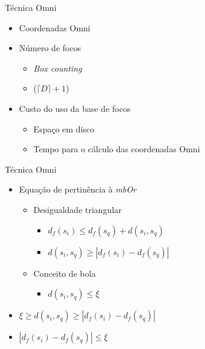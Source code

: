 \documentclass{beamer}
\begin{document}
\begin{frame}{Técnica Omni}
  
  \begin{itemize}
    
   \item Coordenadas Omni \newline
   
   \item Número de focos
      \begin{itemize}
	\item \textit{Box counting}\newline
	\item ($\lceil D \rceil +1$) \newline
      \end{itemize}
   
    \item Custo do uso da base de focos
      \begin{itemize}
	\item Espaço em disco\newline
	\item Tempo para o cálculo das coordenadas Omni\newline
      \end{itemize}	
  \end{itemize}

 
\end{frame}

\begin{frame}{Técnica Omni}

	\begin{itemize}
	 \item Equação de pertinência à \textit{mbOr}\newline
	    \begin{itemize}
	      \item Desigualdade triangular\newline
		\begin{itemize}
		  \item $d_{f}(s_i) \leq d_{f}(s_q) + d(s_i, s_q)$\newline
		  \item $d(s_i, s_q) \geq |d_{f}(s_i) - d_{f}(s_q)|$\newline
		\end{itemize}
	      \item Conceito de bola\newline
		\begin{itemize}
		  \item $d(s_i, s_q) \leq \xi$\newline
		\end{itemize}
	    \end{itemize}
	\item $\xi \geq d(s_i,s_q) \geq |d_f(s_i) - d_f(s_q)|$\newline
	\item $|d_f(s_i) - d_f(s_q)| \leq \xi$
	\end{itemize}

\end{frame}
\end{document}
